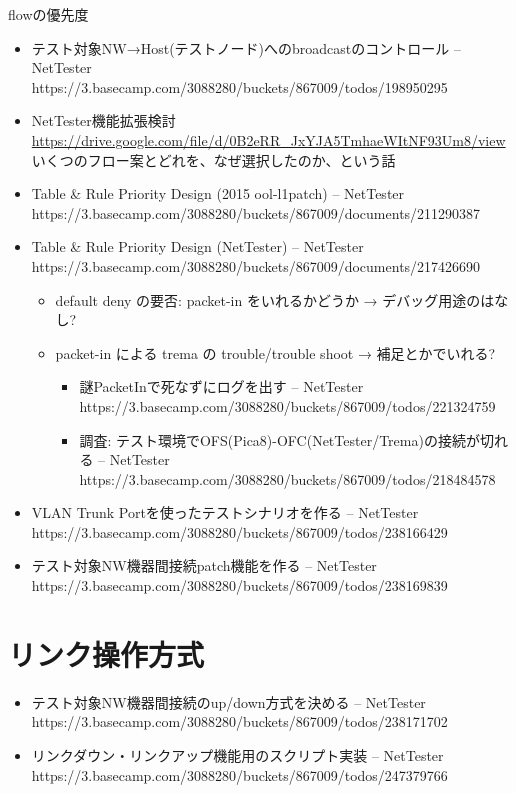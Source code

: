 flowの優先度
\begin{itemize}
 \item テスト対象NW→Host(テストノード)へのbroadcastのコントロール – NetTester https://3.basecamp.com/3088280/buckets/867009/todos/198950295
 \item NetTester機能拡張検討
       \url{https://drive.google.com/file/d/0B2eRR_JxYJA5TmhaeWItNF93Um8/view}
       いくつのフロー案とどれを、なぜ選択したのか、という話
 \item Table \& Rule Priority Design (2015 ool-l1patch) – NetTester https://3.basecamp.com/3088280/buckets/867009/documents/211290387
 \item Table \& Rule Priority Design (NetTester) – NetTester https://3.basecamp.com/3088280/buckets/867009/documents/217426690
       \begin{itemize}
        \item default deny の要否: packet-in をいれるかどうか → デバッグ用途のはなし?
        \item packet-in による trema の trouble/trouble shoot → 補足とかでいれる?
              \begin{itemize}
               \item 謎PacketInで死なずにログを出す – NetTester https://3.basecamp.com/3088280/buckets/867009/todos/221324759
               \item 調査: テスト環境でOFS(Pica8)-OFC(NetTester/Trema)の接続が切れる – NetTester https://3.basecamp.com/3088280/buckets/867009/todos/218484578
              \end{itemize}
       \end{itemize}
 \item VLAN Trunk Portを使ったテストシナリオを作る – NetTester https://3.basecamp.com/3088280/buckets/867009/todos/238166429
 \item テスト対象NW機器間接続patch機能を作る – NetTester https://3.basecamp.com/3088280/buckets/867009/todos/238169839
\end{itemize}

\section{リンク操作方式}

\begin{itemize}
 \item テスト対象NW機器間接続のup/down方式を決める – NetTester https://3.basecamp.com/3088280/buckets/867009/todos/238171702
 \item リンクダウン・リンクアップ機能用のスクリプト実装 – NetTester https://3.basecamp.com/3088280/buckets/867009/todos/247379766
\end{itemize}

